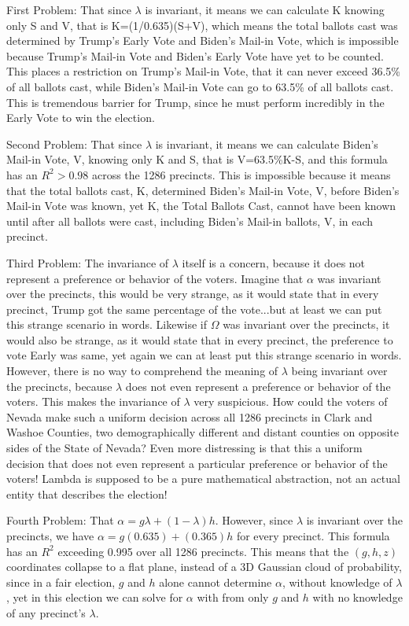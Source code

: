 \documentclass[preprint,13pt]{elsarticle}
\begin{document}
First Problem: That since $\lambda$ is invariant, it means we can calculate K knowing only S and V, that is K=(1/0.635)(S+V), which means the total ballots cast was determined by Trump's Early Vote and Biden's Mail-in Vote, which is impossible because Trump's Mail-in Vote and Biden's Early Vote have yet to be counted. This places a restriction on Trump's Mail-in Vote, that it can never exceed 36.5\% of all ballots cast, while Biden's Mail-in Vote can go to 63.5\% of all ballots cast. This is tremendous barrier for Trump, since he must perform incredibly in the Early Vote to win the election.

Second Problem: That since $\lambda$ is invariant, it means we can calculate Biden's Mail-in Vote, V, knowing only K and S, that is V=63.5\%K-S, and this formula has an $R^2>0.98$ across the 1286 precincts. This is impossible because it means that the total ballots cast, K, determined Biden's Mail-in Vote, V, before Biden's Mail-in Vote was known, yet K, the Total Ballots Cast, cannot have been known until after all ballots were cast, including Biden's Mail-in ballots, V, in each precinct.

Third Problem:  The invariance of $\lambda$ itself is a concern, because it does not represent a preference or behavior of the voters. Imagine that $\alpha$ was invariant over the precincts, this would be very strange, as it would state that in every precinct, Trump got the same percentage of the vote...but at least we can put this strange scenario in words. Likewise if $\Omega$ was invariant over the precincts, it would also be strange, as it would state that in every precinct, the preference to vote Early was same, yet again we can at least put this strange scenario in words. However, there is no way to comprehend the meaning of $\lambda$ being invariant over the precincts, because $\lambda$ does not even represent a preference or behavior of the voters. This makes the invariance of $\lambda$ very suspicious. How could the voters of Nevada make such a uniform decision across all 1286 precincts in Clark and Washoe Counties, two demographically different and distant counties on opposite sides of the State of Nevada? Even more distressing is that this a uniform decision that does not even represent a particular preference or behavior of the voters! Lambda is supposed to be a pure mathematical abstraction, not an actual entity that describes the election!

Fourth Problem: That $\alpha=g\lambda+(1-\lambda)h$. However, since $\lambda$ is invariant over the precincts, we have $\alpha=g(0.635)+(0.365)h$ for every precinct. This formula has an $R^2$ exceeding 0.995 over all 1286 precincts.  This means that the $(g,h,z)$ coordinates collapse to a flat plane, instead of a 3D Gaussian cloud of probability, since in a fair election, $g$ and $h$ alone cannot determine $\alpha$, without knowledge of $\lambda$, yet in this election we can solve for $\alpha$ with from only $g$ and $h$ with no knowledge of any precinct's $\lambda$.
\end{document}
